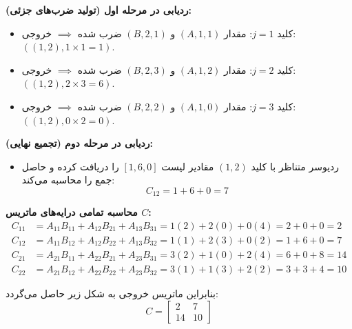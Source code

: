 \documentclass[11pt,a4paper]{article}
\begin{document}
	\textbf{ردیابی در مرحله اول (تولید ضرب‌های جزئی):}
	\begin{itemize}
		\item کلید $j=1$: مقدار $(A, 1, 1)$ و $(B, 2, 1)$ ضرب شده $\implies$ خروجی: $((1, 2), 1 \times 1 = 1)$.
		\item کلید $j=2$: مقدار $(A, 1, 2)$ و $(B, 2, 3)$ ضرب شده $\implies$ خروجی: $((1, 2), 2 \times 3 = 6)$.
		\item کلید $j=3$: مقدار $(A, 1, 0)$ و $(B, 2, 2)$ ضرب شده $\implies$ خروجی: $((1, 2), 0 \times 2 = 0)$.
	\end{itemize}
	
	\textbf{ردیابی در مرحله دوم (تجمیع نهایی):}
	\begin{itemize}
		\item ردیوسر متناظر با کلید $(1, 2)$ مقادیر لیست $[1, 6, 0]$ را دریافت کرده و حاصل جمع را محاسبه می‌کند:
		\begin{equation}
			C_{12} = 1 + 6 + 0 = 7
		\end{equation}
	\end{itemize}
	
	\textbf{محاسبه تمامی درایه‌های ماتریس $C$:}
	\begin{align}
		C_{11} &= A_{11}B_{11} + A_{12}B_{21} + A_{13}B_{31} = 1(2) + 2(0) + 0(4) = 2 + 0 + 0 = 2 \\
		C_{12} &= A_{11}B_{12} + A_{12}B_{22} + A_{13}B_{32} = 1(1) + 2(3) + 0(2) = 1 + 6 + 0 = 7 \\
		C_{21} &= A_{21}B_{11} + A_{22}B_{21} + A_{23}B_{31} = 3(2) + 1(0) + 2(4) = 6 + 0 + 8 = 14 \\
		C_{22} &= A_{21}B_{12} + A_{22}B_{22} + A_{23}B_{32} = 3(1) + 1(3) + 2(2) = 3 + 3 + 4 = 10
	\end{align}
	
	بنابراین ماتریس خروجی به شکل زیر حاصل می‌گردد:
	\begin{equation}
		C = \begin{bmatrix} 2 & 7 \\ 14 & 10 \end{bmatrix}
	\end{equation}
	
\end{document}
